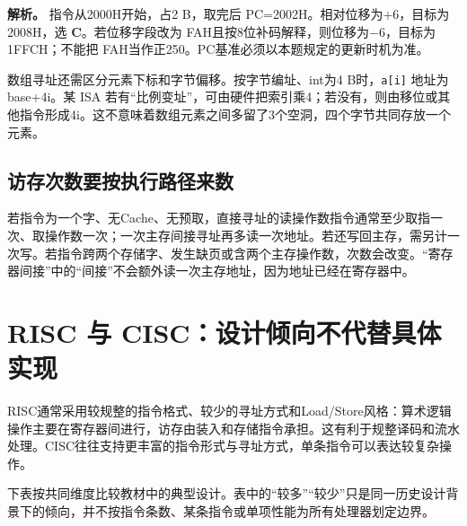 \textbf{解析。} 指令从2000H开始，占2 B，取完后 PC=2002H。相对位移为+6，目标为2008H，选 \textbf{C}。若位移字段改为 FAH且按8位补码解释，则位移为\ensuremath{-}6，目标为1FFCH；不能把 FAH当作正250。PC基准必须以本题规定的更新时机为准。

数组寻址还需区分元素下标和字节偏移。按字节编址、int为4 B时，\texttt{a[i]} 地址为base+4i。某 ISA 若有``比例变址''，可由硬件把索引乘4；若没有，则由移位或其他指令形成4i。这不意味着数组元素之间多留了3个空洞，四个字节共同存放一个元素。

\subsection{访存次数要按执行路径来数}\label{CO04-06}

若指令为一个字、无Cache、无预取，直接寻址的读操作数指令通常至少取指一次、取操作数一次；一次主存间接寻址再多读一次地址。若还写回主存，需另计一次写。若指令跨两个存储字、发生缺页或含两个主存操作数，次数会改变。``寄存器间接''中的``间接''不会额外读一次主存地址，因为地址已经在寄存器中。

\section{RISC 与 CISC：设计倾向不代替具体实现}\label{CO04-07}

RISC通常采用较规整的指令格式、较少的寻址方式和Load/Store风格：算术逻辑操作主要在寄存器间进行，访存由装入和存储指令承担。这有利于规整译码和流水处理。CISC往往支持更丰富的指令形式与寻址方式，单条指令可以表达较复杂操作。

下表按共同维度比较教材中的典型设计。表中的``较多''``较少''只是同一历史设计背景下的倾向，并不按指令条数、某条指令或单项性能为所有处理器划定边界。

